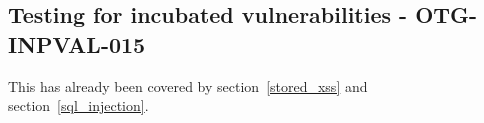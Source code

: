 \subsection{Testing for incubated vulnerabilities - OTG-INPVAL-015}
This has already been covered by section~\ref{stored_xss} and section~\ref{sql_injection}.
\clearpage